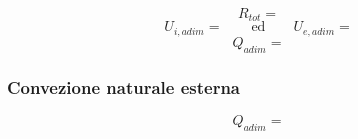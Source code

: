 \documentclass[a4paper,10pt]{article}                                                                                       %
\begin{document}
\begin{equation}                                                                                                            %
  R_{tot} =                                                                                       %
  \label{eqn:tot_r}                                                                                                         %
\end{equation}                                                                                                              %
\begin{equation}                                                                                                            %
  U_{i,adim} =                                                                                    %
  \qquad\text{ed}\qquad                                                                                                     %
  U_{e,adim} =                                                                                    %
  \label{eqn:ohtc}                                                                                                          %
\end{equation}                                                                                                              %
\begin{equation}                                                                                                            %
  Q_{adim} =                                                                                      %
  \label{eqn:recalc_heat_tr}                                                                                                %
\end{equation}                                                                                                              %
\subsubsection{Convezione naturale esterna}                                                                                 %
\label{subsubsec:ext_air_conv}                                                                                              %
\begin{equation}                                                                                                            %
  Q_{adim} =                                                                                      %
  \label{eqn:recalc_heat_tr}                                                                                                %
\end{equation}                                                                                                              %
\end{document}
